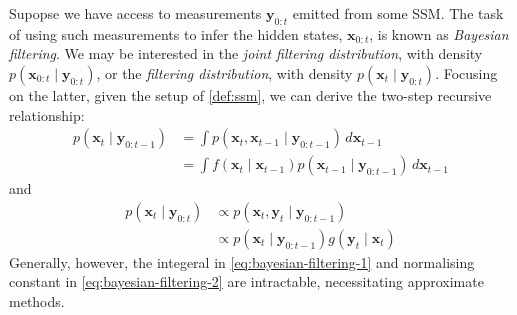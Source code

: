 \begin{definition} \label{def:bayesian-filtering}
    Supopse we have access to measurements $\mathbf{y}_{0:t}$ emitted from some
    SSM. The task of using such measurements to infer the hidden states, $\mathbf{x}_{0:t}$, is
    known as \emph{Bayesian filtering}. We may be interested in the
    \emph{joint filtering distribution}, with density $p(\mathbf{x}_{0:t} \mid \mathbf{y}_{0:t})$,
    or the \emph{filtering distribution}, with density $p(\mathbf{x}_t \mid \mathbf{y}_{0:t})$.
    Focusing on the latter, given the setup of \ref{def:ssm}, we can derive the two-step recursive
    relationship:
    \begin{align}
        p(\mathbf{x}_t \mid \mathbf{y}_{0:t-1}) &= \int p(\mathbf{x}_t, \mathbf{x}_{t-1} \mid \mathbf{y}_{0:t-1})\, d\mathbf{x}_{t-1} \\
        &= \int f(\mathbf{x}_t \mid \mathbf{x}_{t - 1})p(\mathbf{x}_{t-1} \mid \mathbf{y}_{0:t-1})\, d\mathbf{x}_{t-1} \label{eq:bayesian-filtering-1}
    \end{align}
    and
    \begin{align}
        p(\mathbf{x}_t \mid \mathbf{y}_{0:t}) &\propto p(\mathbf{x}_t, \mathbf{y}_t \mid \mathbf{y}_{0:t-1}) \\
        &\propto p(\mathbf{x}_t \mid \mathbf{y}_{0:t-1})g(\mathbf{y}_t \mid \mathbf{x}_t) \label{eq:bayesian-filtering-2}
    \end{align}
    Generally, however, the integeral in \ref{eq:bayesian-filtering-1} and normalising constant in
    \ref{eq:bayesian-filtering-2} are intractable, necessitating approximate methods.
\end{definition}

